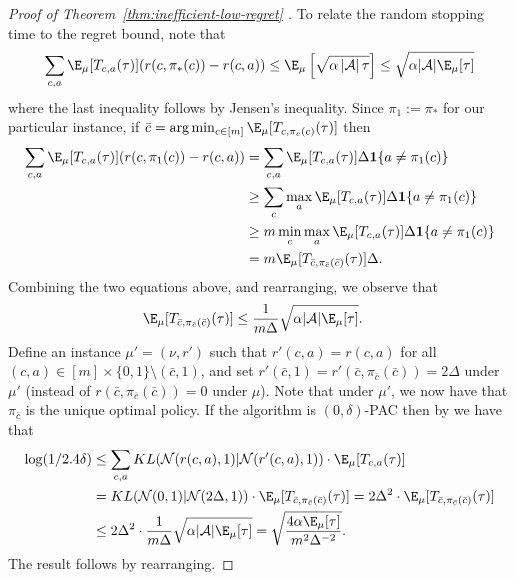 \documentclass{article}
\newcommand{\mc}[1]{\mathcal{#1}}
\newcommand{\1}{\mathbf{1}}
\begin{document}
\begin{proof}[Proof of Theorem~\ref{thm:inefficient-low-regret} ]
To relate the random stopping time to the regret bound, note that
\begin{align*}
    \sum_{c,a} \E_\mu[ T_{c,a}(\tau) ] ( r(c,\pi_*(c)) - r(c,a) ) \leq \E_\mu\left[ \sqrt{\alpha \, |\mc{A}| \, \tau} \right] \leq \sqrt{\alpha |\mc{A}| \E_\mu[\tau]} 
\end{align*}
where the last inequality follows by Jensen's inequality.
Since $\pi_1 := \pi_*$ for our particular instance, if $\bar{c} = \arg\min_{c \in [m]} \E_\mu[ T_{c,\pi_c(c)}(\tau) ]$ then
\begin{align*}
    \sum_{c,a} \E_\mu[ T_{c,a}(\tau) ] ( r(c,\pi_1(c)) - r(c,a) ) &= \sum_{c,a} \E_\mu[ T_{c,a}(\tau) ] \Delta \1\{ a \neq \pi_1(c) \} \\
    &\geq \sum_{c} \max_a \E_\mu[ T_{c,a}(\tau) ] \Delta \1\{ a \neq \pi_1(c) \} \\
    &\geq m \min_{c} \max_{a} \E_\mu[ T_{c,a}(\tau) ] \Delta \1\{ a \neq \pi_1(c) \} \\
    &= m \E_\mu[ T_{\bar{c},\pi_{\bar{c}}(\bar{c})}(\tau) ] \Delta.
\end{align*}
Combining the two equations above, and rearranging, we observe that
\begin{align*}
    \E_\mu[ T_{\bar{c},\pi_{\bar{c}}(\bar{c})}(\tau) ] &\leq \frac{1}{m \Delta} \sqrt{\alpha |\mc{A}| \E_\mu[\tau]} .
\end{align*}
Define an instance $\mu' = (\nu,r')$ such that $r'(c,a) = r(c,a)$ for all $(c,a) \in [m] \times \{0,1\} \setminus (\bar{c},1)$, and set $r'(\bar{c},1) = r'( \bar{c}, \pi_{\bar{c}}(\bar{c}) ) = 2 \Delta$ under  $\mu'$ (instead of $r( \bar{c}, \pi_{\bar{c}}(\bar{c}) ) = 0$ under $\mu$).
Note that under $\mu'$, we now have that $\pi_{\bar{c}}$ is the unique optimal policy.
If the algorithm is $(0,\delta)$-PAC then by \cite[Lemma 1]{kaufmann2016complexity} we have that
\begin{align*}
   \log(1/2.4 \delta) &\leq \sum_{c,a}  KL( \mc{N}(r(c,a),1) | \mc{N}(r'(c,a),1) ) \cdot \E_\mu[ T_{c,a}(\tau) ] \\
   &= KL( \mc{N}(0,1) | \mc{N}(2 \Delta,1) ) \cdot \E_\mu[ T_{\bar{c},\pi_{\bar{c}}(\bar{c})}(\tau) ] = 2 \Delta^2 \cdot \E_\mu[ T_{\bar{c},\pi_{\bar{c}}(\bar{c})}(\tau) ] \\
   &\leq 2 \Delta^2 \cdot \frac{1}{m \Delta} \sqrt{\alpha |\mc{A}| \E_\mu[\tau]}  = \sqrt{\frac{ 4 \alpha \E_\mu[\tau] }{m^2 \Delta^{-2}}}.
\end{align*}
The result follows by rearranging.
\end{proof}
\end{document}
